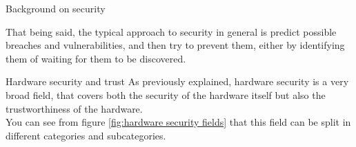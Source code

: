 \begin{section}{Background on security}
  \begin{figure}[H]
    \centering
    \hfill
  \end{figure}
  That being said, the typical approach to security in general is predict possible breaches and 
  vulnerabilities, and then try to prevent them, either by identifying them of waiting for them to
  be discovered.\\
  \begin{subsection}{Hardware security and trust}
    As previously explained, hardware security is a very broad field, that covers both the security
    of the hardware itself but also the trustworthiness of the hardware.\\
    You can see from figure \ref{fig:hardware security fields} that this field can be split in different 
    categories and subcategories.\\


\end{subsection}
\end{section}
